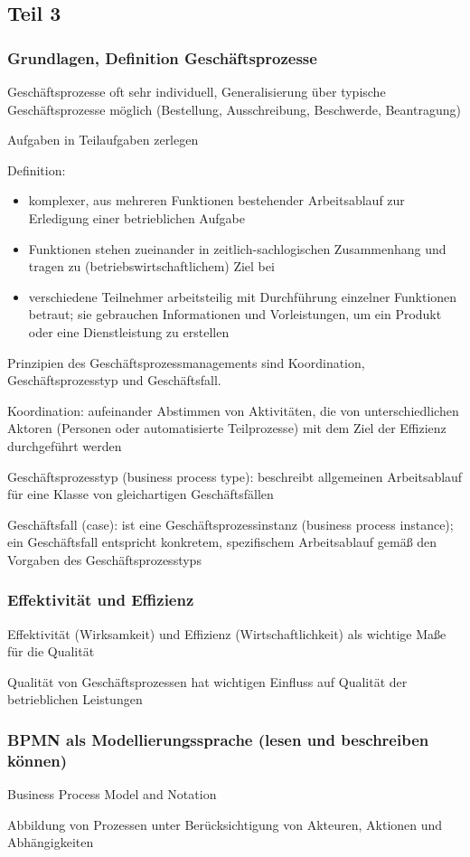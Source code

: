 \subsection{Teil 3}
\subsubsection{Grundlagen, Definition Geschäftsprozesse}
Geschäftsprozesse oft sehr individuell, Generalisierung über typische Geschäftsprozesse möglich (Bestellung, Ausschreibung, Beschwerde, Beantragung)
\par
Aufgaben in Teilaufgaben zerlegen
\par
Definition:
\begin{itemize}
  \item komplexer, aus mehreren Funktionen bestehender Arbeitsablauf zur Erledigung einer betrieblichen Aufgabe
  \item Funktionen stehen zueinander in zeitlich-sachlogischen Zusammenhang und tragen zu (betriebswirtschaftlichem) Ziel bei
  \item verschiedene Teilnehmer arbeitsteilig mit Durchführung einzelner Funktionen betraut; sie gebrauchen Informationen und Vorleistungen, um ein Produkt oder eine Dienstleistung zu erstellen
\end{itemize}
Prinzipien des Geschäftsprozessmanagements sind Koordination, Geschäftsprozesstyp und Geschäftsfall.
\par
Koordination: aufeinander Abstimmen von Aktivitäten, die von unterschiedlichen Aktoren (Personen oder automatisierte Teilprozesse) mit dem Ziel der Effizienz durchgeführt werden
\par
Geschäftsprozesstyp (business process type): beschreibt allgemeinen Arbeitsablauf für eine Klasse von gleichartigen Geschäftsfällen
\par
Geschäftsfall (case): ist eine Geschäftsprozessinstanz (business process instance); ein Geschäftsfall entspricht konkretem, spezifischem Arbeitsablauf gemäß den Vorgaben des Geschäftsprozesstyps
\par
\subsubsection{Effektivität und Effizienz}
Effektivität (Wirksamkeit) und Effizienz (Wirtschaftlichkeit) als wichtige Maße für die Qualität
\par
Qualität von Geschäftsprozessen hat wichtigen Einfluss auf Qualität der betrieblichen Leistungen
\subsubsection{BPMN als Modellierungssprache (lesen und beschreiben können)}
Business Process Model and Notation
\par
Abbildung von Prozessen unter Berücksichtigung von Akteuren, Aktionen und Abhängigkeiten
